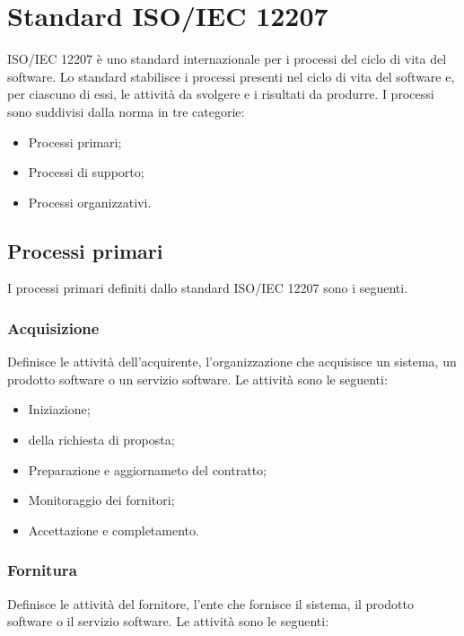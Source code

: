\appendix
\section{Standard ISO/IEC 12207}
ISO/IEC 12207 è uno standard internazionale per i processi del ciclo di vita del software. Lo standard stabilisce i processi presenti nel ciclo di vita del software e, per ciascuno di essi, le attività da svolgere e i risultati da produrre.
I processi sono suddivisi dalla norma in tre categorie:

\begin{itemize}
	
	\item Processi primari;
	
	\item Processi di supporto;
	
	\item Processi organizzativi. 
\end{itemize}

\subsection{Processi primari}
I processi primari definiti dallo standard ISO/IEC 12207 sono i seguenti.

\subsubsection{Acquisizione}
Definisce le attività dell'acquirente, l'organizzazione che acquisisce un sistema, un prodotto software o un servizio software.
Le attività sono le seguenti:

\begin{itemize}

\item Iniziazione;

\item \Preparazione della richiesta di proposta;
\item Preparazione e aggiornameto del contratto;
\item Monitoraggio dei fornitori;

\item Accettazione e completamento.

\end{itemize}

\subsubsection{Fornitura}
Definisce le attività del fornitore, l'ente che fornisce il sistema, il prodotto software o il servizio software.
Le attività sono le seguenti:

